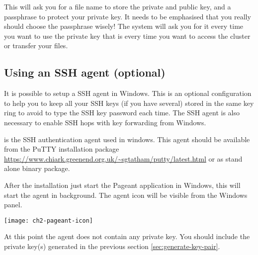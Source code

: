   This will ask you for a file name to store the private and public key, and a
  passphrase to protect your private key. It needs to be emphasised that you
  really should choose the passphrase wisely! The system will ask you for it
  every time you want to use the private key that is every time you want to
  access the cluster or transfer your files.

\fi %



\subsection{Using an SSH agent (optional)}
\label{sec:using-ssh-agent-with-openssh}
\ifwindows
  It is possible to setup a SSH agent in Windows. This is an optional configuration to help
  you to keep all your SSH keys (if you have several) stored in the same key ring to avoid to type the
  SSH key password each time. The SSH agent is also necessary to enable SSH hops with key forwarding from Windows.
  
   is the SSH authentication agent used in windows. This agent should be available 
  from the PuTTY installation package \url{https://www.chiark.greenend.org.uk/~sgtatham/putty/latest.html}
  or as stand alone binary package.
  
  After the installation just start the Pageant application in Windows, this will start the agent in background.
  The agent icon will be visible from the Windows panel.
  \begin{center}
    \texttt{[image: ch2-pageant-icon]}
  \end{center}
  At this point the agent does not contain any private key. You should include the private key(s)
  generated in the previous section \autoref{sec:generate-key-pair}.
  
